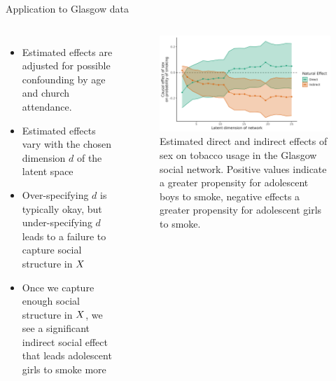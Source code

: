 \documentclass[aspectratio=169]{beamer}
\theoremstyle{remark}
\begin{document}
\begin{frame}{Application to Glasgow data}

    \begin{columns}


        \footnotesize

        \begin{itemize}
            \item Estimated effects are adjusted for possible confounding by age and church attendance.
            \item Estimated effects vary with the chosen dimension $d$ of the latent space
            \item Over-specifying $d$ is typically okay, but under-specifying $d$ leads to a failure to capture social structure in $X$
            \item Once we capture enough social structure in $X$, we see a significant indirect social effect that leads adolescent girls to smoke more
        \end{itemize}


        \begin{figure}[ht!]
            \centering
            \includegraphics[width=\textwidth]{figures/glasgow/effects.png}
            \caption{Estimated direct and indirect effects of sex on tobacco usage in the Glasgow social network. Positive values indicate a greater propensity for adolescent boys to smoke, negative effects a greater propensity for adolescent girls to smoke.}
            \label{fig:glasgow-estimates}
        \end{figure}
    \end{columns}

\end{frame}
\end{document}
